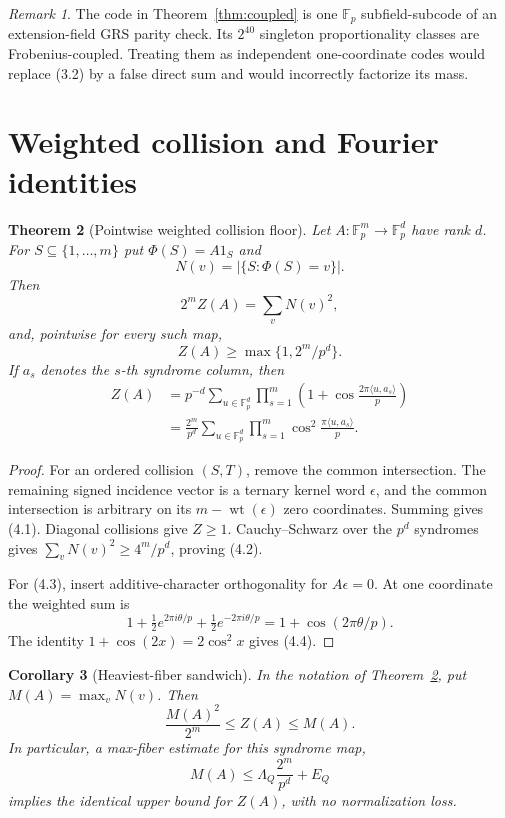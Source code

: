 \documentclass[11pt,a4paper]{amsart}
\newtheorem{theorem}{Theorem}[section]
\newtheorem{corollary}[theorem]{Corollary}
\theoremstyle{remark}
\newtheorem{remark}[theorem]{Remark}
\newcommand{\F}{\mathbb F}
\newcommand{\wt}{\operatorname{wt}}
\begin{document}
\begin{remark}
The code in Theorem~\ref{thm:coupled} is one $\F_p$ subfield-subcode of an
extension-field GRS parity check.  Its $2^{40}$ singleton proportionality
classes are Frobenius-coupled.  Treating them as independent one-coordinate
codes would replace (3.2) by a false direct sum and would incorrectly
factorize its mass.
\end{remark}

\section{Weighted collision and Fourier identities}

\begin{theorem}[Pointwise weighted collision floor]\label{thm:floor}
Let $A:\F_p^m\to\F_p^d$ have rank $d$.  For
$S\subseteq\{1,\ldots,m\}$ put $\Phi(S)=A1_S$ and
\[
 N(v)=|\{S:\Phi(S)=v\}|.
\]
Then
\[
 2^m Z(A)=\sum_vN(v)^2,                                \tag{4.1}
\]
and, pointwise for every such map,
\[
 Z(A)\ge\max\{1,2^m/p^d\}.                            \tag{4.2}
\]
If $a_s$ denotes the $s$-th syndrome column, then
\begin{align}
 Z(A)
 &=p^{-d}\sum_{u\in\F_p^d}
   \prod_{s=1}^m
   \left(1+\cos\frac{2\pi\langle u,a_s\rangle}{p}\right) \tag{4.3}\\
 &=\frac{2^m}{p^d}\sum_{u\in\F_p^d}
   \prod_{s=1}^m
   \cos^2\frac{\pi\langle u,a_s\rangle}{p}.          \tag{4.4}
\end{align}
\end{theorem}

\begin{proof}
For an ordered collision $(S,T)$, remove the common intersection.  The
remaining signed incidence vector is a ternary kernel word $\epsilon$, and
the common intersection is arbitrary on its $m-\wt(\epsilon)$ zero
coordinates.  Summing gives (4.1).  Diagonal collisions give $Z\ge1$.
Cauchy--Schwarz over the $p^d$ syndromes gives
$\sum_vN(v)^2\ge4^m/p^d$, proving (4.2).

For (4.3), insert additive-character orthogonality for $A\epsilon=0$.
At one coordinate the weighted sum is
\[
 1+\tfrac12e^{2\pi i\theta/p}+\tfrac12e^{-2\pi i\theta/p}
 =1+\cos(2\pi\theta/p).
\]
The identity $1+\cos(2x)=2\cos^2x$ gives (4.4).
\end{proof}

\begin{corollary}[Heaviest-fiber sandwich]\label{cor:maxfiber}
In the notation of Theorem~\ref{thm:floor}, put
\(M(A)=\max_v N(v)\).  Then
\[
 \frac{M(A)^2}{2^m}\le Z(A)\le M(A).                \tag{4.5}
\]
In particular, a max-fiber estimate for this syndrome map,
\[
 M(A)\le \Lambda_Q\frac{2^m}{p^d}+E_Q
\]
implies the identical upper bound for $Z(A)$, with no normalization loss.
\end{corollary}
\end{document}
